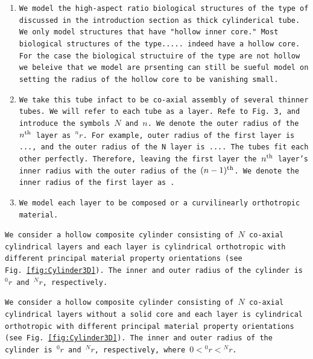 \documentclass[preprint,12pt,times]{elsarticle}
\numberwithin{equation}{section}
\renewcommand{\>}{$\Rightarrow$}
\begin{document}
\begin{enumerate}
  \item \texttt{We model the high-aspect ratio biological structures of the type of discussed in the introduction section as thick cylinderical tube. We only model structures that have "hollow inner core." Most biological structures of the type..... indeed have a hollow core. For the case the biological structuire of the type are not hollow we beleive that we model are prsenting can still be sueful model on setting the radius of the hollow core to be vanishing small.}

  \item \texttt{We take this tube infact to be co-axial assembly of several thinner tubes. We will refer to each tube as a layer. Refe to Fig. 3, and introduce the symbols $N$ and $n$. We denote the outer radius of the $n^{\rm th}$ layer as $^{n}r$. For example, outer radius of the first layer is ..., and the outer radius of the N layer is ....
  The tubes fit each other perfectly. Therefore, leaving the first layer the $n^{\rm th}$ layer's inner radius with the outer radius of the $(n-1)^{\rm th}$. We denote the inner radius of the first layer as .}

  \item \texttt{We model each layer to be composed or a curvilinearly orthotropic material.}

\end{enumerate}


\texttt{We consider a hollow composite cylinder consisting of~$N$ co-axial cylindrical layers and each layer is cylindrical orthotropic with different principal material property orientations (see Fig.~\ref{fig:Cylinder3D}). The inner and outer radius of the cylinder is~${}^{0}\!{r}$ and~${}^{N}\!{r}$, respectively.}

\texttt{We consider a hollow composite cylinder consisting of~$N$ co-axial cylindrical layers without a solid core and each layer is cylindrical orthotropic with different principal material property orientations (see Fig.~\ref{fig:Cylinder3D}). The inner and outer radius of the cylinder is~${}^{0}\!{r}$ and~${}^{N}\!{r}$, respectively, where $0 < {}^{0}\!{r}<{}^{N}\!{r}$.}
\end{document}
